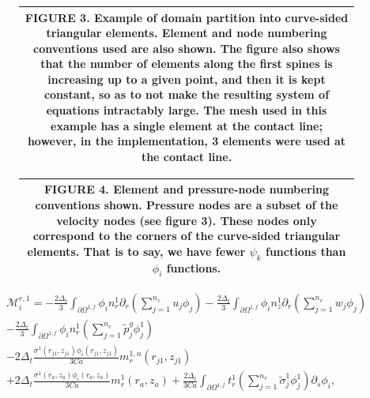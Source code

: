 \documentclass{article}
\begin{document}
\begin{figure}[h]
\centering
\begin{tabular}{|c|}
\hline
FIGURE 3. Example of domain partition into curve-sided triangular elements. Element and node numbering conventions used are also shown. The figure also shows that the number of elements along the first spines is increasing up to a given point, and then it is kept constant, so as to not make the resulting system of equations intractably large. The mesh used in this example has a single element at the contact line; however, in the implementation, 3 elements were used at the contact line. \\
\hline
\end{tabular}
\end{figure}

\begin{figure}[h]
\centering
\begin{tabular}{|c|}
\hline
FIGURE 4. Element and pressure-node numbering conventions shown. Pressure nodes are a subset of the velocity nodes (see figure 3). These nodes only correspond to the corners of the curve-sided triangular elements. That is to say, we have fewer \(\psi_k\) functions than \(\phi_i\) functions. \\
\hline
\end{tabular}
\end{figure}

\begin{equation}
\begin{array}{l} \mathcal{M}_i^{r,1} = -\frac{2\Delta_t}{3} \int_{\partial \Omega^{1,f}} \phi_i n_r^1 \partial_r \left( \sum_{j=1}^{n_v} u_j \phi_j \right) - \frac{2\Delta_t}{3} \int_{\partial \Omega^{1,f}} \phi_i n_z^1 \partial_r \left( \sum_{j=1}^{n_v} w_j \phi_j \right) \\ - \frac{2\Delta_t}{3} \int_{\partial \Omega^{1,f}} \phi_i n_r^1 \left( \sum_{j=1}^{n_v} \tilde{p}_j^g \phi_j^1 \right) \\ - 2\Delta_t \frac{\sigma^1(r_{j1},z_{j1})\phi_i(r_{j1},z_{j1})}{3Ca} m_r^{1,n}(r_{j1},z_{j1}) \\ + 2\Delta_t \frac{\sigma^1(r_a,z_a)\phi_i(r_a,z_a)}{3Ca} m_r^{1}(r_a,z_a) + \frac{2\Delta_t}{3Ca} \int_{\partial \Omega^{1,f}} t_r^1 \left( \sum_{j=1}^{n_v} \tilde{\sigma}_j^1 \phi_j^1 \right) \partial_s \phi_i, \end{array} \tag{4.83}
\end{equation}
\end{document}
